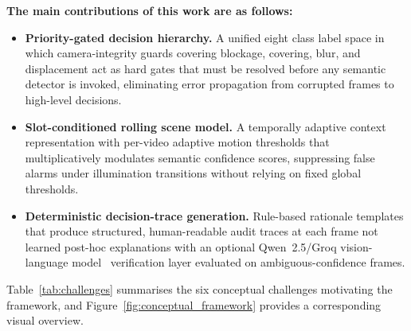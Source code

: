 \documentclass[a4paper,fleqn]{cas-dc}
\begin{document}
\noindent\textbf{The main contributions of this work are as follows:}
 
\begin{itemize}
 
\item \textbf{Priority-gated decision hierarchy.} A unified eight class label space in which camera-integrity guards covering blockage, covering, blur, and displacement act as hard gates that must be resolved before any semantic detector is invoked, eliminating error propagation from corrupted frames to high-level decisions.
 
\item \textbf{Slot-conditioned rolling scene model.} A temporally adaptive context representation with per-video adaptive motion thresholds that multiplicatively modulates semantic confidence scores, suppressing false alarms under illumination transitions without relying on fixed global thresholds.
 
\item \textbf{Deterministic decision-trace generation.} Rule-based rationale templates that produce structured, human-readable audit traces at each frame not learned post-hoc explanations with an optional Qwen~2.5/Groq vision-language model~\citep{qwen25vl2025,groqapi2025} verification layer evaluated on ambiguous-confidence frames.
 
\end{itemize}
 
Table~\ref{tab:challenges} summarises the six conceptual challenges motivating the framework, and Figure~\ref{fig:conceptual_framework} provides a corresponding visual overview.
 
\end{document}
